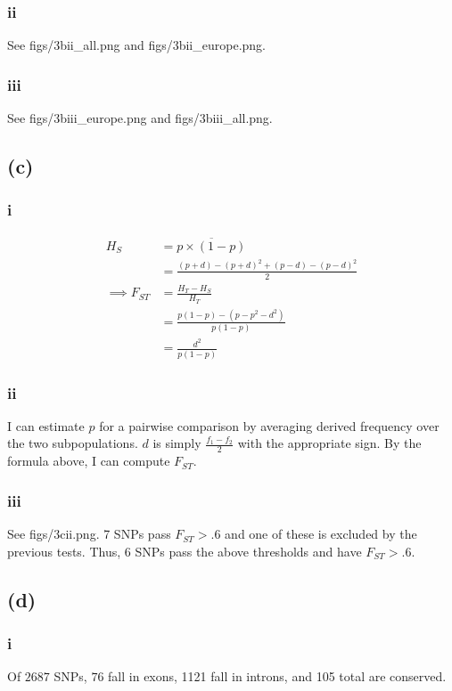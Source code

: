 \documentclass[12pt,draft,a4paper]{article}
\begin{document}
\subsubsection*{ii}

See figs/3bii\_all.png and figs/3bii\_europe.png.

\subsubsection*{iii}

See figs/3biii\_europe.png and figs/3biii\_all.png.

\subsection*{(c)}
\subsubsection*{i}
\begin{align*} H_S &= \overline{p\times(1 - p)}\\
&=\frac{\left(p+d\right) - \left(p+d\right)^2 + \left(p-d\right) - \left(p-d\right)^2}{2}\\
\implies F_{ST} &= \frac{H_T - H_S}{H_T}\\
&= \frac{ p(1-p) - (p-p^2-d^2)}{p(1-p)}\\
&=\frac{d^2}{p(1-p)}\end{align*}

\subsubsection*{ii}
I can estimate $p$ for a pairwise comparison by averaging derived frequency over the two subpopulations. $d$ is simply $\frac{f_1 - f_2}{2}$ with the appropriate sign. By the formula above, I can compute $F_{ST}$.

\subsubsection*{iii}
See figs/3cii.png. 7 SNPs pass $F_{ST}>.6$ and one of these is excluded by the previous tests. Thus, 6 SNPs pass the above thresholds and have $F_{ST} > .6$.


\subsection*{(d)}
\subsubsection*{i}
Of $2687$ SNPs, $76$ fall in exons, 1121 fall in introns, and 105 total are conserved.
\end{document}
